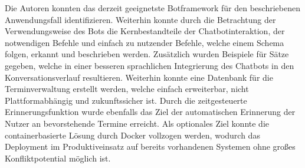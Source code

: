 Die Autoren konnten das derzeit geeignetste Botframework für den beschriebenen Anwendungsfall identifizieren. Weiterhin konnte durch die Betrachtung der Verwendungsweise des Bots die Kernbestandteile der Chatbotinteraktion, der notwendigen Befehle und einfach zu nutzender Befehle, welche einem Schema folgen, erkannt und beschrieben werden. Zusätzlich wurden Beispiele für Sätze gegeben, welche in einer besseren sprachlichen Integrierung des Chatbots in den Konversationsverlauf resultieren. Weiterhin konnte eine Datenbank für die Terminverwaltung erstellt werden, welche einfach erweiterbar, nicht Plattformabhängig und zukunftssicher ist. Durch die zeitgesteuerte Erinnerungsfunktion wurde ebenfalls das Ziel der automatischen Erinnerung der Nutzer an bevorstehende Termine erreicht. Als optionales Ziel konnte die containerbasierte Lösung durch Docker vollzogen werden, wodurch das Deployment im Produktiveinsatz auf bereits vorhandenen Systemen ohne großes Konfliktpotential möglich ist.